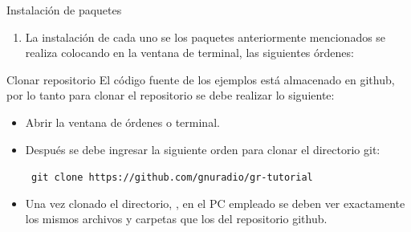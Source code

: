 
\begin{frame}{Instalación de paquetes}
\begin{enumerate}[1.]
\item La instalación de cada uno se los paquetes anteriormente mencionados se realiza colocando en la ventana de terminal, las siguientes órdenes:
\end{enumerate}



\end{frame}



\begin{frame}{Clonar repositorio}
El código fuente de los ejemplos está almacenado en github, por lo tanto para clonar el repositorio se debe realizar lo siguiente:
\begin{itemize}
\item Abrir la ventana de órdenes o terminal.
\item Después se debe ingresar la siguiente orden para clonar el directorio git:

\begin{block}{}
  \texttt{
    git clone https://github.com/gnuradio/gr-tutorial}
  \end{block}

\item Una vez clonado el directorio, , en el PC empleado se deben ver exactamente los mismos archivos y carpetas que los del repositorio github.
\end{itemize}
\end{frame}


